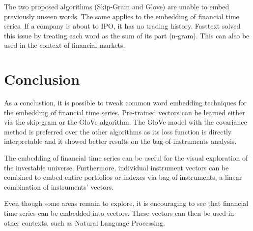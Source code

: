\documentclass[a4paper, 11pt]{article}
\begin{document}
The two proposed algorithms (Skip-Gram and Glove) are unable to embed previously unseen words. The same applies to the embedding of financial time series. If a company is about to IPO, it has no trading history. Fasttext \cite{bojanowski2016enriching} solved this issue by treating each word as the sum of its part (n-gram). This can also be used in the context of financial markets. 


\section{Conclusion}
As a conclustion, it is possible to tweak common word embedding techniques for the embedding of financial time series. Pre-trained vectors can be learned either via the skip-gram or the GloVe algorithm. The GloVe model with the covariance method is preferred over the other algorithms as its loss function is directly interpretable and it showed better results on the bag-of-instruments analysis. 

The embedding of financial time series can be useful for the visual exploration of the investable universe. Furthermore, individual instrument vectors can be combined to embed entire portfolios or indexes via bag-of-instruments, a linear combination of instruments' vectors.

Even though some areas remain to explore, it is encouraging to see that financial time series can be embedded into vectors. These vectors can then be used in other contexts, such as Natural Language Processing.


 
\end{document}
